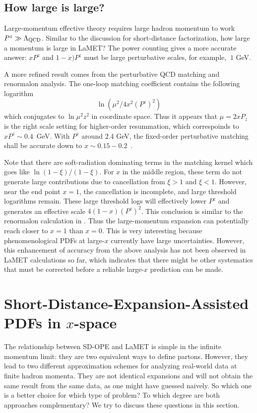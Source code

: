 \documentclass[prd,aps,twocolumn,preprintnumbers,showpacs,nofootinbib,superscriptaddress,notitlepage]{revtex4-2}
\begin{document}
\subsection{How large is large?}

Large-momentum effective theory requires large hadron momentum to work $P^z\gg \Lambda_{\rm QCD}$. Similar to the discussion for short-distance factorization, how large a momentum is large in LaMET? The power counting gives a more accurate answer: $xP^z$ and $1-x)P^z$ must be large perturbative scales, for example, $~1$ GeV. 

A more refined result comes from the perturbative QCD matching and renormalon analysis. The one-loop matching coefficient contains the following logarithm~\cite{Izubuchi:2018srq}
\begin{equation}
    \ln (\mu^2/4x^2(P^z)^2)
\end{equation}
which conjugates to $\ln \mu^2z^2$ in coordinate space. Thus it appears that $\mu = 2xP_z$ is the right scale setting for higher-order resummation, which correspoinds to $xP^z\sim 0.4$~GeV. With
$P^z$ around 2.4 GeV, the fixed-order perturbative matching shall be accurate down to $x\sim 0.15-0.2$~\cite{Su:2022fiu}.

Note that there are soft-radiation dominating terms in the matching kernel which goes like $\ln(1-\xi)/(1-\xi)$. For $x$ in the middle region, these term do not generate large contributions due to cancellation from $\xi>1$ and $\xi<1$. However, 
near the end point $x=1$, the cancellation is incomplete, and large threshold logarithms remain. These large threshold logs
will effectively lower $P^z$ and generates an effective scale $4(1-x)(P^z)^2$. This conclusion
is similar to the renormalon calculation in \cite{Braun:2018brg}. Thus the large-momentum expansion can potentially reach closer to $x=1$ than $x=0$. This is very interesting because phenomenological PDFs at large-$x$ currently have large uncertainties.  However, this enhancement of accuracy from the above analysis has not been observed in LaMET calculations so far, which indicates that there might be other systematics that must be corrected  before a reliable large-$x$ prediction can be made. 

\section{Short-Distance-Expansion-Assisted PDFs in $x$-space}

The relationship between SD-OPE and LaMET is simple in the infinite momentum limit: they are two equivalent ways to define partons. However, they lead to two different approximation schemes for analyzing real-world data 
at finite hadron momenta. They are not identical expansions and will not obtain the same result from the same data, as one might have guessed naively. So which one is a better choice for which type of problem? To which degree are both approaches complementary? We try to discuss these questions in this section. 
\end{document}
